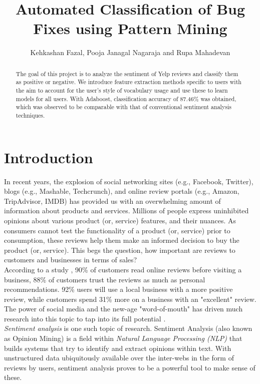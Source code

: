 \documentclass[letterpaper, 10 pt, conference]{ieeeconf}  %
\title{\LARGE \bf
Automated Classification of Bug Fixes using Pattern Mining
}
\author{Kehkashan Fazal, Pooja Janagal Nagaraja and Rupa Mahadevan}%
\begin{document}
 

\maketitle

\begin{abstract}

The goal of this project is to analyze the sentiment of Yelp reviews and classify them as positive or negative. We introduce feature extraction methods specific to users with the aim to account for the user's style of vocabulary usage and use these to learn models for all users. With Adaboost, classification accuracy of 87.46\% was obtained, which was observed to be comparable with that of conventional sentiment analysis techniques. 

\end{abstract}

\section{Introduction}

In recent years, the explosion of social networking sites (e.g., Facebook, Twitter), blogs (e.g., Mashable, Techcrunch), and online review portals (e.g., Amazon, TripAdvisor, IMDB) has provided us with an overwhelming amount of information about products and services. Millions of people express uninhibited opinions about various product (or, service) features, and their nuances. As consumers cannot test the functionality of a product (or, service) prior to consumption, these reviews help them make an informed decision to buy the product (or, service). This begs the question, how important are reviews to customers and businesses in terms of sales?\\

According to a study \cite{c1}, 90\% of customers read online reviews before visiting a business, 88\% of customers trust the reviews as much as personal recommendations. 92\% users will use a local business with a more positive review, while customers spend 31\% more on a business with an "excellent" review. The power of social media and the new-age "word-of-mouth" has driven much research into this topic to tap into its full potential . \\

\textit{Sentiment analysis} is one such topic of research. Sentiment Analysis (also known as Opinion Mining) is a field within \textit{Natural Language Processing (NLP)} that builds systems that try to identify and extract opinions within text. With unstructured data ubiquitously available over the inter-webs in the form of reviews by users, sentiment analysis proves to be a powerful tool to make sense of these. \\
\end{document}
